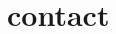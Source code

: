 \section{contact}
\begin{adjustwidth}{2cm}{}
  \vspace{-2\parskip}
  \begin{multicols}{3}
    {}

  \end{multicols}
  \vspace{-1\parskip}
\end{adjustwidth}